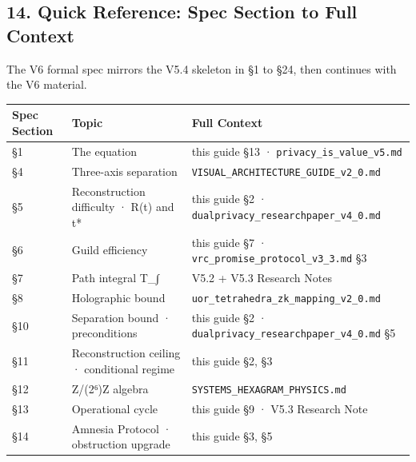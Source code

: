 \documentclass[
]{article}
\newcounter{none} %
\begin{document}
\subsection{14. Quick Reference: Spec Section to Full
Context}\label{quick-reference-spec-section-to-full-context}

The V6 formal spec mirrors the V5.4 skeleton in §1 to §24, then
continues with the V6 material.

{\def\LTcaptype{none} %
\begin{longtable}[]{@{}
  >{\raggedright\arraybackslash}p{}
  >{\raggedright\arraybackslash}p{}
  >{\raggedright\arraybackslash}p{}@{}}
\toprule\noalign{}
\begin{minipage}[b]{\linewidth}\raggedright
Spec Section
\end{minipage} & \begin{minipage}[b]{\linewidth}\raggedright
Topic
\end{minipage} & \begin{minipage}[b]{\linewidth}\raggedright
Full Context
\end{minipage} \\
\midrule\noalign{}
\endhead
\bottomrule\noalign{}
\endlastfoot
§1 & The equation & this guide §13 ·
\texttt{privacy\_is\_value\_v5.md} \\
§4 & Three-axis separation &
\texttt{VISUAL\_ARCHITECTURE\_GUIDE\_v2\_0.md} \\
§5 & Reconstruction difficulty · R(t) and t* & this guide §2 ·
\texttt{dualprivacy\_researchpaper\_v4\_0.md} \\
§6 & Guild efficiency & this guide §7 ·
\texttt{vrc\_promise\_protocol\_v3\_3.md} §3 \\
§7 & Path integral T\_∫ & V5.2 + V5.3 Research Notes \\
§8 & Holographic bound &
\texttt{uor\_tetrahedra\_zk\_mapping\_v2\_0.md} \\
§10 & Separation bound · preconditions & this guide §2 ·
\texttt{dualprivacy\_researchpaper\_v4\_0.md} §5 \\
§11 & Reconstruction ceiling · conditional regime & this guide §2, §3 \\
§12 & Z/(2⁶)Z algebra & \texttt{SYSTEMS\_HEXAGRAM\_PHYSICS.md} \\
§13 & Operational cycle & this guide §9 · V5.3 Research Note \\
§14 & Amnesia Protocol · obstruction upgrade & this guide §3, §5 \\

\end{longtable}}
\end{document}
